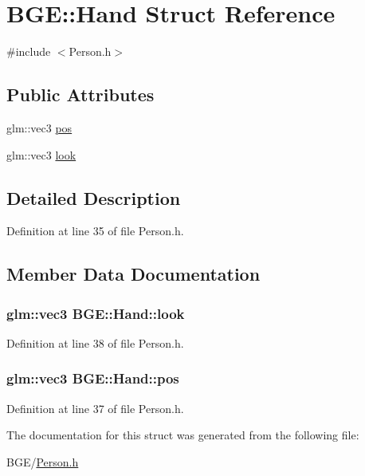 \hypertarget{struct_b_g_e_1_1_hand}{\section{B\-G\-E\-:\-:Hand Struct Reference}
\label{struct_b_g_e_1_1_hand}
}


{\ttfamily \#include $<$Person.\-h$>$}

\subsection*{Public Attributes}
\begin{DoxyCompactItemize}
\item 
glm\-::vec3 \hyperlink{struct_b_g_e_1_1_hand_a87bd7061236c991f965e444430cbdf1c}{pos}
\item 
glm\-::vec3 \hyperlink{struct_b_g_e_1_1_hand_a4556516cf49417040fff0c2fb472b696}{look}
\end{DoxyCompactItemize}


\subsection{Detailed Description}


Definition at line 35 of file Person.\-h.



\subsection{Member Data Documentation}
\hypertarget{struct_b_g_e_1_1_hand_a4556516cf49417040fff0c2fb472b696}{
\subsubsection[{look}]{\setlength{\rightskip}{0pt plus 5cm}glm\-::vec3 B\-G\-E\-::\-Hand\-::look}}\label{struct_b_g_e_1_1_hand_a4556516cf49417040fff0c2fb472b696}


Definition at line 38 of file Person.\-h.

\hypertarget{struct_b_g_e_1_1_hand_a87bd7061236c991f965e444430cbdf1c}{
\subsubsection[{pos}]{\setlength{\rightskip}{0pt plus 5cm}glm\-::vec3 B\-G\-E\-::\-Hand\-::pos}}\label{struct_b_g_e_1_1_hand_a87bd7061236c991f965e444430cbdf1c}


Definition at line 37 of file Person.\-h.



The documentation for this struct was generated from the following file\-:\begin{DoxyCompactItemize}
\item 
B\-G\-E/\hyperlink{_person_8h}{Person.\-h}\end{DoxyCompactItemize}
